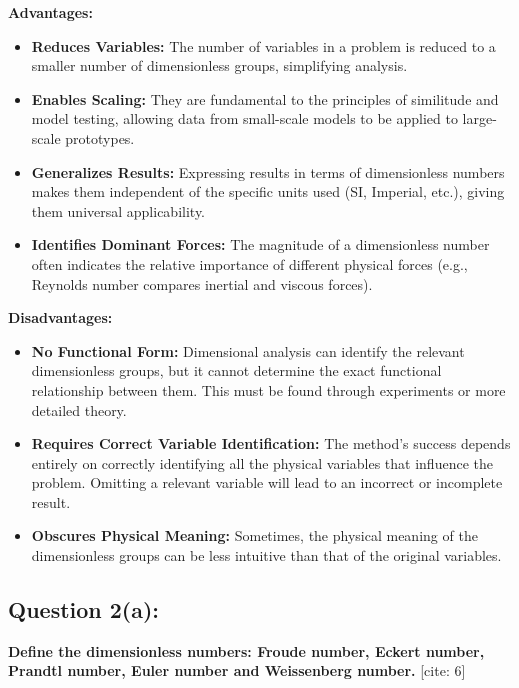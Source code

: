 \documentclass{article}
\begin{document}
\textbf{Advantages:}
\begin{itemize}
    \item \textbf{Reduces Variables:} The number of variables in a problem is reduced to a smaller number of dimensionless groups, simplifying analysis.
    \item \textbf{Enables Scaling:} They are fundamental to the principles of similitude and model testing, allowing data from small-scale models to be applied to large-scale prototypes.
    \item \textbf{Generalizes Results:} Expressing results in terms of dimensionless numbers makes them independent of the specific units used (SI, Imperial, etc.), giving them universal applicability.
    \item \textbf{Identifies Dominant Forces:} The magnitude of a dimensionless number often indicates the relative importance of different physical forces (e.g., Reynolds number compares inertial and viscous forces).
\end{itemize}

\textbf{Disadvantages:}
\begin{itemize}
    \item \textbf{No Functional Form:} Dimensional analysis can identify the relevant dimensionless groups, but it cannot determine the exact functional relationship between them. This must be found through experiments or more detailed theory.
    \item \textbf{Requires Correct Variable Identification:} The method's success depends entirely on correctly identifying all the physical variables that influence the problem. Omitting a relevant variable will lead to an incorrect or incomplete result.
    \item \textbf{Obscures Physical Meaning:} Sometimes, the physical meaning of the dimensionless groups can be less intuitive than that of the original variables.
\end{itemize}
\hrulefill

\subsection*{\textbf{Question 2(a):}}
\textbf{Define the dimensionless numbers: Froude number, Eckert number, Prandtl number, Euler number and Weissenberg number.} [cite: 6]
\end{document}

